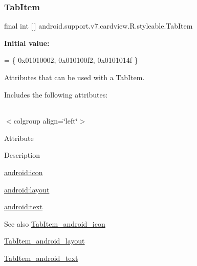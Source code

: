 \subsubsection{\texorpdfstring{Tab\+Item}{TabItem}}
{\footnotesize\ttfamily final int \mbox{[}$\,$\mbox{]} android.\+support.\+v7.\+cardview.\+R.\+styleable.\+Tab\+Item\hspace{0.3cm}{\ttfamily [static]}}

{\bfseries Initial value\+:}
\begin{DoxyCode}
= \{
            0x01010002, 0x010100f2, 0x0101014f
        \}
\end{DoxyCode}
Attributes that can be used with a Tab\+Item. 

Includes the following attributes\+:

\tabulinesep=1mm
\begin{longtabu} spread 0pt [c]{*{0}{|X[-1]}|}
\hline
\end{longtabu}
$<$colgroup align=\char`\"{}left\char`\"{}$>$ 

Attribute

Description 

{\ttfamily \hyperlink{classandroid_1_1support_1_1v7_1_1cardview_1_1R_1_1styleable_aa4f4bd92f5fcdb273f04a20e103a944b}{android\+:icon}}

{\ttfamily \hyperlink{classandroid_1_1support_1_1v7_1_1cardview_1_1R_1_1styleable_aad53ae51e3318cabf258aa1e281c34fe}{android\+:layout}}

{\ttfamily \hyperlink{classandroid_1_1support_1_1v7_1_1cardview_1_1R_1_1styleable_ad0e92cbb6d2f273d7c8007f245cccb84}{android\+:text}}

\begin{DoxySeeAlso}{See also}
\hyperlink{classandroid_1_1support_1_1v7_1_1cardview_1_1R_1_1styleable_aa4f4bd92f5fcdb273f04a20e103a944b}{Tab\+Item\+\_\+android\+\_\+icon} 

\hyperlink{classandroid_1_1support_1_1v7_1_1cardview_1_1R_1_1styleable_aad53ae51e3318cabf258aa1e281c34fe}{Tab\+Item\+\_\+android\+\_\+layout} 

\hyperlink{classandroid_1_1support_1_1v7_1_1cardview_1_1R_1_1styleable_ad0e92cbb6d2f273d7c8007f245cccb84}{Tab\+Item\+\_\+android\+\_\+text} 
\end{DoxySeeAlso}
\mbox{\label{classandroid_1_1support_1_1v7_1_1cardview_1_1R_1_1styleable_aa4f4bd92f5fcdb273f04a20e103a944b}} 
